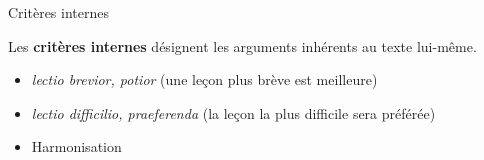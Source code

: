 \documentclass[11pt]{beamer}
\begin{document}
\begin{frame}{Critères internes}

    \begin{definition}
        Les \textbf{critères internes} désignent les arguments inhérents au texte lui-même.
    \end{definition}
    
    \begin{exampleblock}{}
        \begin{itemize}
            \item \textit{lectio brevior, potior} (une leçon plus brève est meilleure)
            \item \textit{lectio difficilio, praeferenda} (la leçon la plus difficile sera préférée)
            \item Harmonisation
        \end{itemize}
    \end{exampleblock}
    
\end{frame}
\end{document}
